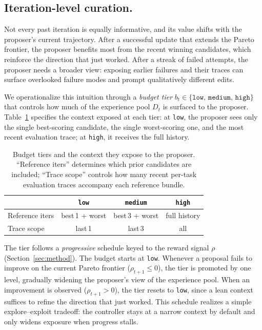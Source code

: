 \subsection{Iteration-level curation.}
\label{ssec:iteration}
Not every past iteration is equally informative, and its value shifts with the proposer's current trajectory. After a successful update that extends the Pareto frontier, the proposer benefits most from the recent winning candidates, which reinforce the direction that just worked. After a streak of failed attempts, the proposer needs a broader view: exposing earlier failures and their traces can surface overlooked failure modes and prompt qualitatively different edits.

We operationalize this intuition through a \emph{budget tier}
$b_t \in \{\texttt{low},\, \texttt{medium},\, \texttt{high}\}$ that controls how much of the experience pool $D_t$ is surfaced to the proposer.  Table~\ref{tab:budgets} specifies the context exposed at each tier: at \texttt{low}, the proposer sees only the single best-scoring candidate, the single worst-scoring one, and the most recent evaluation trace; at \texttt{high}, it receives the full history.

\begin{table}[h]
\centering
\small
\caption{Budget tiers and the context they expose to the proposer. ``Reference iters'' determines which prior candidates are included; ``Trace scope'' controls how many recent per-task evaluation traces accompany each reference bundle.}
\begin{tabular}{@{}lccc@{}}
\toprule
 & \texttt{low} & \texttt{medium} & \texttt{high} \\
\midrule
Reference iters & best\,1 + worst & best\,3 + worst & full history \\
Trace scope     & last\,1         & last\,3         & all \\
\bottomrule
\end{tabular}
\label{tab:budgets}
\end{table}

The tier follows a \emph{progressive} schedule keyed to the reward signal $\rho$ (Section~\ref{sec:method}). The budget starts at \texttt{low}. Whenever a proposal fails to improve on the current Pareto frontier ($\rho_{t+1} \leq 0$), the tier is promoted by one level, gradually widening the proposer's view of the experience pool. When an improvement is observed ($\rho_{t+1} > 0$), the tier resets to \texttt{low}, since a lean context suffices to refine the direction that just worked. This schedule realizes a simple explore--exploit tradeoff: the controller stays at a narrow context by default and only widens exposure when progress stalls.

